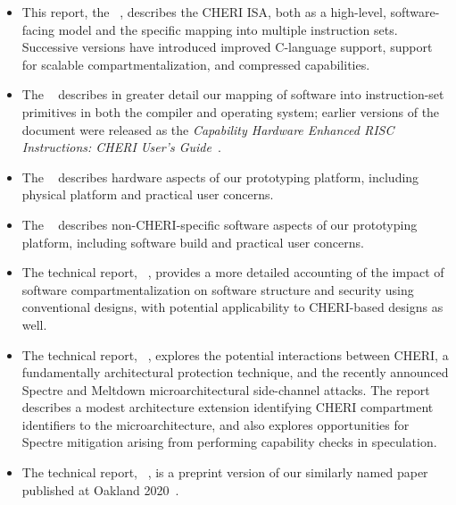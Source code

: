 \begin{itemize}
\item This report, the ~\cite{UCAM-CL-TR-850, UCAM-CL-TR-864,
  UCAM-CL-TR-876, UCAM-CL-TR-891, UCAM-CL-TR-907, UCAM-CL-TR-927,
  UCAM-CL-TR-951},
  describes the CHERI ISA, both as a high-level, software-facing
  model and the specific mapping into multiple instruction sets.
  Successive versions have introduced improved C-language support, support for
  scalable compartmentalization, and compressed capabilities.

\item The ~\cite{UCAM-CL-TR-877} describes in greater detail our
  mapping of software into instruction-set primitives in both the compiler and
  operating system; earlier versions of the document were released as the
  \textit{Capability Hardware Enhanced RISC Instructions: CHERI User's
  Guide}~\cite{UCAM-CL-TR-851}.

\item The ~\cite{UCAM-CL-TR-852, UCAM-CL-TR-868} describes hardware aspects
  of our prototyping platform, including physical platform and practical user
  concerns.

\item The ~\cite{UCAM-CL-TR-853, UCAM-CL-TR-869} describes
  non-CHERI-specific software aspects of our prototyping platform, including
  software build and practical user concerns.

\item The technical report, ~\cite{UCAM-CL-TR-873}, provides a more
  detailed accounting of the impact of software compartmentalization on
  software structure and security using conventional designs, with potential
  applicability to CHERI-based designs as well.

\item The technical report, ~\cite{UCAM-CL-TR-916},
  explores the potential interactions between
  CHERI, a fundamentally architectural protection technique, and the recently
  announced Spectre and Meltdown microarchitectural side-channel attacks.
  The report describes a modest architecture extension identifying CHERI
  compartment identifiers to the microarchitecture, and also explores
  opportunities for Spectre mitigation arising from performing capability
  checks in speculation.

\item The technical report, ~\cite{UCAM-CL-TR-940},
  is a preprint version of our similarly named
  paper published at Oakland 2020~\cite{cheri-formal-SP2020}.


\end{itemize}
